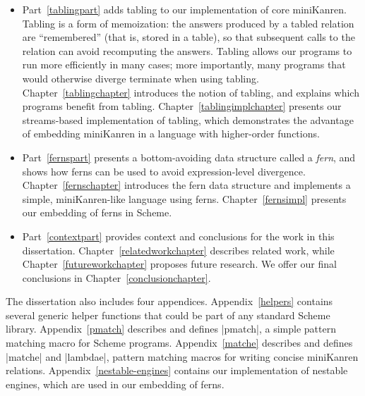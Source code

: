 \begin{itemize}
\item Part~\ref{tablingpart} adds tabling to our implementation of
  core miniKanren.  Tabling is a form of memoization: the answers
  produced by a tabled relation are ``remembered'' (that is, stored in
  a table), so that subsequent calls to the relation can avoid
  recomputing the answers.  Tabling allows our programs to run more
  efficiently in many cases; more importantly, many programs that
  would otherwise diverge terminate when using tabling.
  Chapter~\ref{tablingchapter} introduces the notion of tabling, and
  explains which programs benefit from tabling.
  Chapter~\ref{tablingimplchapter} presents our streams-based
  implementation of tabling, which demonstrates the advantage of
  embedding miniKanren in a language with higher-order functions.

\item Part~\ref{fernspart} presents a bottom-avoiding data structure
  called a \emph{fern}, and shows how ferns can be used to avoid
  expression-level divergence.  Chapter~\ref{fernschapter} introduces
  the fern data structure and implements a simple, miniKanren-like
  language using ferns.  Chapter~\ref{fernsimpl} presents our
  embedding of ferns in Scheme.

\item Part~\ref{contextpart} provides context and conclusions for the
  work in this dissertation.  Chapter~\ref{relatedworkchapter}
  describes related work, while Chapter~\ref{futureworkchapter}
  proposes future research.  We offer our final conclusions in
  Chapter~\ref{conclusionchapter}.

\end{itemize}

The dissertation also includes four appendices.
Appendix~\ref{helpers} contains several generic helper functions that
could be part of any standard Scheme library.  Appendix~\ref{pmatch}
describes and defines \scheme|pmatch|, a simple pattern matching macro
for Scheme programs.  Appendix~\ref{matche} describes and defines
\scheme|matche| and \scheme|lambdae|, pattern matching macros for
writing concise miniKanren relations.  Appendix~\ref{nestable-engines}
contains our implementation of nestable engines, which are used in our
embedding of ferns.





